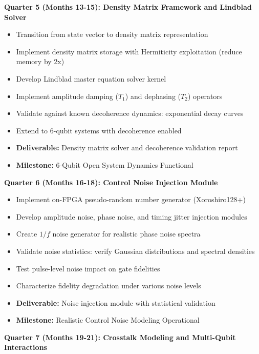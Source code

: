 \documentclass[12pt,a4paper]{article}
\begin{document}
\textbf{Quarter 5 (Months 13-15): Density Matrix Framework and Lindblad Solver}

\begin{itemize}[noitemsep]
\item Transition from state vector to density matrix representation
\item Implement density matrix storage with Hermiticity exploitation (reduce memory by 2x)
\item Develop Lindblad master equation solver kernel
\item Implement amplitude damping ($T_1$) and dephasing ($T_2$) operators
\item Validate against known decoherence dynamics: exponential decay curves
\item Extend to 6-qubit systems with decoherence enabled
\item \textbf{Deliverable:} Density matrix solver and decoherence validation report
\item \textbf{Milestone:} 6-Qubit Open System Dynamics Functional
\end{itemize}

\textbf{Quarter 6 (Months 16-18): Control Noise Injection Module}

\begin{itemize}[noitemsep]
\item Implement on-FPGA pseudo-random number generator (Xoroshiro128+)
\item Develop amplitude noise, phase noise, and timing jitter injection modules
\item Create $1/f$ noise generator for realistic phase noise spectra
\item Validate noise statistics: verify Gaussian distributions and spectral densities
\item Test pulse-level noise impact on gate fidelities
\item Characterize fidelity degradation under various noise levels
\item \textbf{Deliverable:} Noise injection module with statistical validation
\item \textbf{Milestone:} Realistic Control Noise Modeling Operational
\end{itemize}

\textbf{Quarter 7 (Months 19-21): Crosstalk Modeling and Multi-Qubit Interactions}
\end{document}

